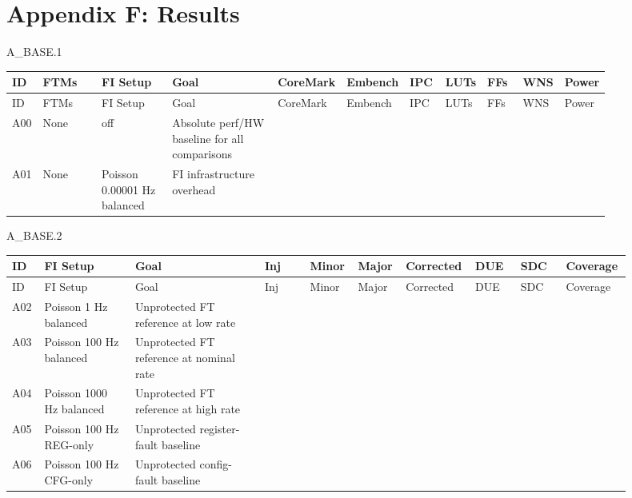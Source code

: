 \chapter{Appendix F: Results}
\label{app_f:results}

A\_BASE.1

\begin{longtable}{|p{0.05\linewidth}|p{0.10\linewidth}|p{0.12\linewidth}|p{0.18\linewidth}|p{0.06\linewidth}|p{0.06\linewidth}|p{0.06\linewidth}|p{0.06\linewidth}|p{0.06\linewidth}|p{0.06\linewidth}|p{0.06\linewidth}|}
\hline
ID & FTMs & FI Setup & Goal & CoreMark & Embench & IPC & LUTs & FFs & WNS & Power \\
\hline
\endfirsthead
\hline
ID & FTMs & FI Setup & Goal & CoreMark & Embench & IPC & LUTs & FFs & WNS & Power \\
\hline
\endhead
A00 & None & off & Absolute perf/HW baseline for all comparisons &  &  &  &  &  &  &  \\
\hline
A01 & None & Poisson 0.00001 Hz \textbar{} balanced & FI infrastructure overhead &  &  &  &  &  &  &  \\
\hline
\end{longtable}

A\_BASE.2

\begin{longtable}{|p{0.05\linewidth}|p{0.14\linewidth}|p{0.20\linewidth}|p{0.07\linewidth}|p{0.07\linewidth}|p{0.07\linewidth}|p{0.08\linewidth}|p{0.07\linewidth}|p{0.07\linewidth}|p{0.08\linewidth}|}
\hline
ID & FI Setup & Goal & Inj & Minor & Major & Corrected & DUE & SDC & Coverage \\
\hline
\endfirsthead
\hline
ID & FI Setup & Goal & Inj & Minor & Major & Corrected & DUE & SDC & Coverage \\
\hline
\endhead
A02 & Poisson 1 Hz \textbar{} balanced & Unprotected FT reference at low rate &  &  &  &  &  &  &  \\
\hline
A03 & Poisson 100 Hz \textbar{} balanced & Unprotected FT reference at nominal rate &  &  &  &  &  &  &  \\
\hline
A04 & Poisson 1000 Hz \textbar{} balanced & Unprotected FT reference at high rate &  &  &  &  &  &  &  \\
\hline
A05 & Poisson 100 Hz \textbar{} REG-only & Unprotected register-fault baseline &  &  &  &  &  &  &  \\
\hline
A06 & Poisson 100 Hz \textbar{} CFG-only & Unprotected config-fault baseline &  &  &  &  &  &  &  \\
\hline
\end{longtable}

